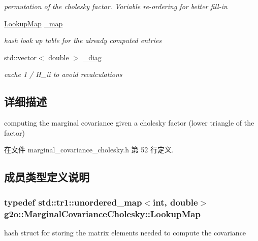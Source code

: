 \begin{DoxyCompactItemize}
\begin{DoxyCompactList}\small\item\em permutation of the cholesky factor. Variable re-\/ordering for better fill-\/in \end{DoxyCompactList}\item 
\hypertarget{classg2o_1_1MarginalCovarianceCholesky_a7a9d21e9ee6654b9e6d69a62e87c201a}{\hyperlink{classg2o_1_1MarginalCovarianceCholesky_a9925dd2e45479a7feb783ff71d93fdbc}{Lookup\-Map} \hyperlink{classg2o_1_1MarginalCovarianceCholesky_a7a9d21e9ee6654b9e6d69a62e87c201a}{\-\_\-map}}\label{classg2o_1_1MarginalCovarianceCholesky_a7a9d21e9ee6654b9e6d69a62e87c201a}

\begin{DoxyCompactList}\small\item\em hash look up table for the already computed entries \end{DoxyCompactList}\item 
\hypertarget{classg2o_1_1MarginalCovarianceCholesky_a6ceee33e0cde1d9a4888abab8b6ad712}{std\-::vector$<$ double $>$ \hyperlink{classg2o_1_1MarginalCovarianceCholesky_a6ceee33e0cde1d9a4888abab8b6ad712}{\-\_\-diag}}\label{classg2o_1_1MarginalCovarianceCholesky_a6ceee33e0cde1d9a4888abab8b6ad712}

\begin{DoxyCompactList}\small\item\em cache 1 / H\-\_\-ii to avoid recalculations \end{DoxyCompactList}\end{DoxyCompactItemize}


\subsection{详细描述}
computing the marginal covariance given a cholesky factor (lower triangle of the factor) 

在文件 marginal\-\_\-covariance\-\_\-cholesky.\-h 第 52 行定义.



\subsection{成员类型定义说明}
\hypertarget{classg2o_1_1MarginalCovarianceCholesky_a9925dd2e45479a7feb783ff71d93fdbc}{
\subsubsection[{Lookup\-Map}]{\setlength{\rightskip}{0pt plus 5cm}typedef std\-::tr1\-::unordered\-\_\-map$<$int, double$>$ {\bf g2o\-::\-Marginal\-Covariance\-Cholesky\-::\-Lookup\-Map}\hspace{0.3cm}{\ttfamily [protected]}}}\label{classg2o_1_1MarginalCovarianceCholesky_a9925dd2e45479a7feb783ff71d93fdbc}
hash struct for storing the matrix elements needed to compute the covariance 

